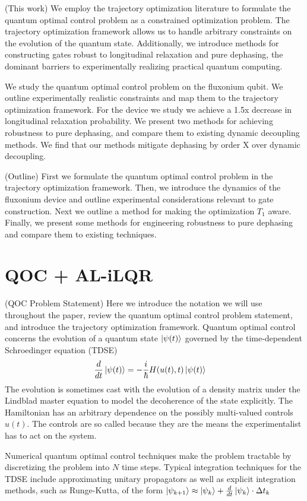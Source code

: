 \documentclass[
  amsfonts,
  amsmath,
  tbtags,
  amssymb,
  aps,
  nobibnotes,
  twocolumn,
]{revtex4-2}
\begin{document}
(This work) We employ the trajectory optimization
literature to formulate the quantum
optimal control problem as a constrained optimization problem.
The trajectory optimization framework allows us to handle arbitrary
constraints on the evolution of the quantum state. Additionally,
we introduce methods for constructing gates robust to longitudinal
relaxation and pure dephasing, the dominant barriers to experimentally
realizing practical quantum computing.

We study the quantum optimal control problem on the fluxonium qubit.
We outline experimentally realistic constraints and map them to
the trajectory optimization framework. For the device we study
we achieve a 1.5x decrease in longitudinal relaxation probability.
We present two methods for achieving robustness to pure dephasing,
and compare them to existing dynamic decoupling methods. We find that 
our methods mitigate dephasing by order X over dynamic decoupling.

(Outline)  First we formulate the quantum optimal control problem
in the trajectory optimization framework. Then, we introduce the dynamics
of the fluxonium device and outline experimental considerations
relevant to gate construction. Next we outline a method for
making the optimization $T_{1}$ aware. Finally, we present
some methods for engineering robustness to pure dephasing and
compare them to existing techniques.


\section{QOC + AL-iLQR}
(QOC Problem Statement) Here we introduce the notation
we will use throughout the paper,
review the quantum optimal control problem statement,
and introduce the trajectory optimization framework.
Quantum optimal control concerns the evolution of
a quantum state $\ket{\psi(t)}$ governed by the time-dependent
Schroedinger equation (TDSE)
\label{eq:tdse}
\begin{align}
  \frac{d}{dt} \ket{\psi(t)} &= -\frac{i}{\hbar} H(u(t), t) \ket{\psi(t)}
\end{align}
The evolution is sometimes cast with the evolution
of a density matrix under the Lindblad master equation to
model the decoherence of the state explicitly. The Hamiltonian
has an arbitrary dependence on the possibly multi-valued controls $u(t)$.
The controls are so called because they are the means the experimentalist has to
act on the system.

Numerical quantum optimal control techniques make
the problem tractable by discretizing the problem into $N$
time steps. Typical integration techniques for the TDSE include
approximating unitary propagators as well as explicit integration methods,
such as Runge-Kutta, of the form
$\ket{\psi_{k + 1}} \approx \ket{\psi_{k}} + \frac{d}{dt} \ket{\psi_{k}} \cdot \Delta t_{k}$
\end{document}
